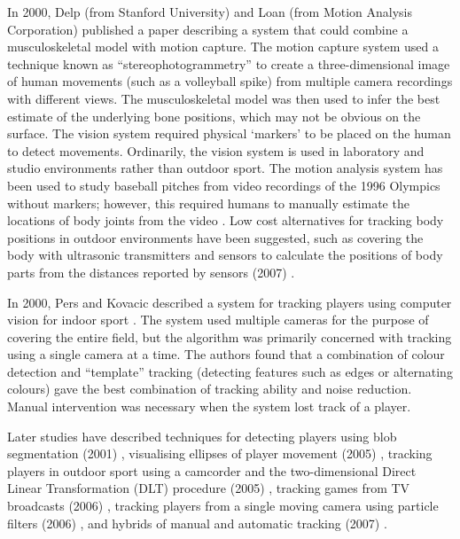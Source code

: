 In 2000, Delp (from Stanford University) and Loan (from Motion Analysis
Corporation) published a paper \cite{Delp2000}
describing a system that could combine a musculoskeletal model with
motion capture. The motion capture system used a technique known as
``stereophotogrammetry'' to create a three-dimensional image of human movements (such
as a volleyball spike) from multiple camera recordings with different
views. The musculoskeletal model was then used to infer the best
estimate of the underlying bone positions, which may not be obvious on
the surface. The vision system required physical `markers' to be placed
on the human to detect movements. Ordinarily, the vision system is used
in laboratory and studio environments rather than outdoor sport. The
motion analysis system has been used to study baseball pitches from
video recordings of the 1996 Olympics without markers; however, this
required humans to manually estimate the locations of body joints from
the video \cite{Escamilla2001}. Low cost
alternatives for tracking body positions in outdoor environments have
been suggested, such as covering the body with ultrasonic transmitters
and sensors to calculate the positions of body parts from the distances
reported by sensors (2007) \cite{Vlasic2007}.

In 2000, Pers and Kovacic described a system for tracking players using computer vision for indoor sport \cite{pers_computer_2000}. The system used multiple cameras for the purpose
of covering the entire field, but the algorithm was primarily concerned
with tracking using a single camera at a time. The authors found that a
combination of colour detection and ``template'' tracking (detecting
features such as edges or alternating colours) gave the best combination
of tracking ability and noise reduction. Manual intervention was
necessary when the system lost track of a player.

Later studies have described techniques for detecting players using blob segmentation (2001) \cite{barros_automatic_2001}, visualising ellipses of player movement (2005) \cite{Misuta2005}, %
tracking players in outdoor sport using a camcorder and the two-dimensional Direct Linear Transformation (DLT) procedure (2005)
\cite{Toki2005}, tracking \soccer{} games from TV
broadcasts (2006) \cite{Beetz2006}, tracking players
from a single moving camera using particle filters (2006)
\cite{Dearden2006}, and hybrids of manual and automatic
tracking (2007) \cite{Barros2007}.

